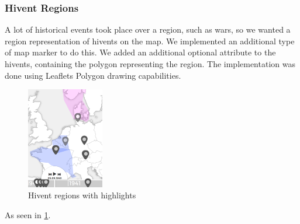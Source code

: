 \subsubsection{Hivent Regions}
A lot of historical events took place over a region, such as wars, so we wanted a region representation of hivents on the map.
We implemented an additional type of map marker to do this.
We added an additional optional attribute to the hivents, containing the polygon representing the region.
The implementation was done using Leaflets Polygon drawing capabilities.

  \begin{figure}[here]
\begin{center}
  \includegraphics[width=0.3\textwidth]{graphics/status2.png}
  \end{center}

  \caption{Hivent regions with highlights}
  \label{fig:hivent_region_highlight}
  \end{figure}

As seen in \ref{fig:hivent_region_highlight}. 



